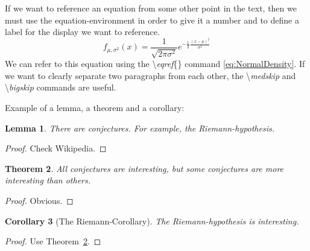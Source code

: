 \documentclass[aodsor,preprint]{imsart}
\numberwithin{equation}{section}
\theoremstyle{plain}
\newtheorem{thm}{Theorem}[section]
\newtheorem{lemma}[thm]{Lemma}
\newtheorem{corollary}[thm]{Corollary}
\begin{document}
If we want to reference an equation from some other point in the text, then we must use the equation-environment in order to give it a number and to define a label for the display we want to reference.
\begin{equation} \label{eq:NormalDensity}
f_{\mu,\sigma^2}(x) = \frac{1}{\sqrt{2\pi\sigma^2}}e^{-\frac12 \frac{(x-\mu)^2}{\sigma^2}}
\end{equation}
We can refer to this equation using the \textbackslash\emph{eqref}\{\} command \eqref{eq:NormalDensity}. If we want to clearly separate two paragraphs from each other, the \textbackslash\emph{medskip} and \textbackslash\emph{bigskip} commands are useful.

\medskip

Example of a lemma, a theorem and a corollary:


\begin{lemma}
There are conjectures. For example, the Riemann-hypothesis.
\end{lemma}
\begin{proof}
Check Wikipedia.
\end{proof}

\begin{thm}\label{thm:Conjectures}
All conjectures are interesting, but some conjectures are more
interesting than others.
\end{thm}

\begin{proof}
Obvious.
\end{proof}

\begin{corollary}[The Riemann-Corollary]
The Riemann-hypothesis is interesting.
\end{corollary}

\begin{proof}
Use Theorem~\ref{thm:Conjectures}.
\end{proof}

\bigskip
\end{document}

